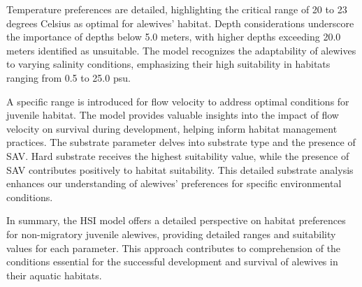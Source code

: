 \documentclass[
]{book}
\begin{document}
Temperature preferences are detailed, highlighting the critical range of 20 to 23 degrees Celsius as optimal for alewives' habitat. Depth considerations underscore the importance of depths below 5.0 meters, with higher depths exceeding 20.0 meters identified as unsuitable. The model recognizes the adaptability of alewives to varying salinity conditions, emphasizing their high suitability in habitats ranging from 0.5 to 25.0 psu.

A specific range is introduced for flow velocity to address optimal conditions for juvenile habitat. The model provides valuable insights into the impact of flow velocity on survival during development, helping inform habitat management practices. The substrate parameter delves into substrate type and the presence of SAV. Hard substrate receives the highest suitability value, while the presence of SAV contributes positively to habitat suitability. This detailed substrate analysis enhances our understanding of alewives' preferences for specific environmental conditions.

In summary, the HSI model offers a detailed perspective on habitat preferences for non-migratory juvenile alewives, providing detailed ranges and suitability values for each parameter. This approach contributes to comprehension of the conditions essential for the successful development and survival of alewives in their aquatic habitats.
\end{document}
